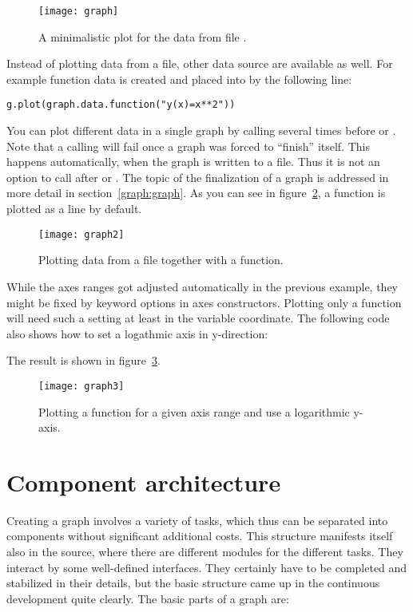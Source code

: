 \begin{figure}[ht]
\centerline{\texttt{[image: graph]}}
\caption{A minimalistic plot for the data from file .}
\label{fig:graph}
\end{figure}

Instead of plotting data from a file, other data source are available
as well. For example function data is created and placed into
 by the following line:
\begin{verbatim}
g.plot(graph.data.function("y(x)=x**2"))
\end{verbatim}
You can plot different data in a single graph by calling
 several times before  or
. Note that a calling  will fail
once a graph was forced to ``finish'' itself. This happens
automatically, when the graph is written to a file. Thus it is not an
option to call  after  or
. The topic of the finalization of a graph is
addressed in more detail in section~\ref{graph:graph}. As you can see
in figure~\ref{fig:graph2}, a function is plotted as a line by
default.

\begin{figure}[ht]
\centerline{\texttt{[image: graph2]}}
\caption{Plotting data from a file together with a function.}
\label{fig:graph2}
\end{figure}

While the axes ranges got adjusted automatically in the previous
example, they might be fixed by keyword options in axes constructors.
Plotting only a function will need such a setting at least in the
variable coordinate. The following code also shows how to set a
logathmic axis in y-direction:



The result is shown in figure~\ref{fig:graph3}.

\begin{figure}[ht]
\centerline{\texttt{[image: graph3]}}
\caption{Plotting a function for a given axis range and use a
logarithmic y-axis.}
\label{fig:graph3}
\end{figure} %

\section{Component architecture} %
\label{graph:components}

Creating a graph involves a variety of tasks, which thus can be
separated into components without significant additional costs.
This structure manifests itself also in the \PyX{} source, where there
are different modules for the different tasks. They interact by some
well-defined interfaces. They certainly have to be completed and
stabilized in their details, but the basic structure came up in the
continuous development quite clearly. The basic parts of a graph are:


